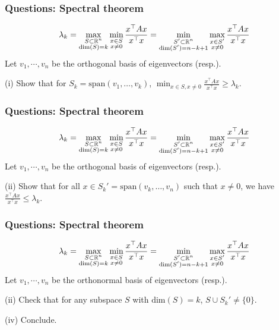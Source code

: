 \documentclass{beamer}
\begin{document}
\begin{frame}[t]
\frametitle{Questions: Spectral theorem}
\vspace{-15pt}
\begin{align*}
\lambda_k = \max_{\substack{S \subset \mathbb{R}^n \\ \text{dim}(S) = k}} \min_{\substack{x \in S \\ x \neq 0}} \frac{x^\top A x}{x^\top x} = \min_{\substack{S' \subset \mathbb{R}^n \\ \text{dim}(S') = n-k+1}} \max_{\substack{x \in S' \\ x \neq 0}} \frac{x^\top A x}{x^\top x}
\end{align*}
Let $v_1, \cdots, v_n$ be the orthogonal basis of eigenvectors (resp.).

(i) Show that for $S_k = \text{span}(v_1, \dots, v_k)$, $\min_{x \in S, x \neq 0} \frac{x^\top A x}{x^\top x} \geq \lambda_k$.
\end{frame}

\begin{frame}[t]
\frametitle{Questions: Spectral theorem}
\vspace{-15pt}
\begin{align*}
\lambda_k = \max_{\substack{S \subset \mathbb{R}^n \\ \text{dim}(S) = k}} \min_{\substack{x \in S \\ x \neq 0}} \frac{x^\top A x}{x^\top x} = \min_{\substack{S' \subset \mathbb{R}^n \\ \text{dim}(S') = n-k+1}} \max_{\substack{x \in S' \\ x \neq 0}} \frac{x^\top A x}{x^\top x}
\end{align*}
Let $v_1, \cdots, v_n$ be the orthogonal basis of eigenvectors (resp.).

(ii) Show that for all $x \in S_k' = \text{span}(v_k, \dots, v_n)$ such that $x \neq 0$, we have  $\frac{x^\top A x}{x^\top x} \leq \lambda_k$.
\end{frame}

\begin{frame}[t]
\frametitle{Questions: Spectral theorem}
\vspace{-15pt}
\begin{align*}
\lambda_k = \max_{\substack{S \subset \mathbb{R}^n \\ \text{dim}(S) = k}} \min_{\substack{x \in S \\ x \neq 0}} \frac{x^\top A x}{x^\top x} = \min_{\substack{S' \subset \mathbb{R}^n \\ \text{dim}(S') = n-k+1}} \max_{\substack{x \in S' \\ x \neq 0}} \frac{x^\top A x}{x^\top x}
\end{align*}
Let $v_1, \cdots, v_n$ be the orthonormal basis of eigenvectors (resp.).

(ii) Check that for any subspace $S$ with $\text{dim}(S) = k$, $S \cup S_k' \neq \{0\}$.

(iv) Conclude.
\end{frame}
\fi
\end{document}
